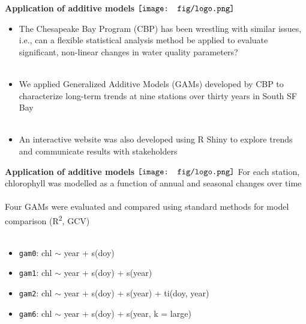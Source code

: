 \documentclass{beamer}
\begin{document}
\begin{frame}{\textbf{Application of additive models} \hspace{0pt plus 1 filll} $\vcenter{\hbox{\texttt{[image: fig/logo.png]}}}$}
\begin{itemize}
\item The Chesapeake Bay Program (CBP) has been wrestling with similar issues, i.e., can a flexible statistical analysis method be applied to evaluate significant, non-linear changes in water quality parameters? {\tiny \cite{Beck17,Murphy19}} \\~\\
\item We applied Generalized Additive Models (GAMs) developed by CBP to characterize long-term trends at nine stations over thirty years in South SF Bay \\~\\
\item An interactive website was also developed using R Shiny to explore trends and communicate results with stakeholders
\end{itemize}
\end{frame}

\begin{frame}{\textbf{Application of additive models} \hspace{0pt plus 1 filll} $\vcenter{\hbox{\texttt{[image: fig/logo.png]}}}$}
For each station, chlorophyll was modelled as a function of annual and seasonal changes over time {\tiny \cite[baytrends R package]{Murphy19b}}\\~\\
Four GAMs were evaluated and compared using standard methods for model comparison (R\textsuperscript{2}, GCV) \\~\\
\begin{itemize}
\item \texttt{gam0}: chl $\sim$ year + s(doy)
\item \texttt{gam1}: chl $\sim$ year + s(doy) + s(year)
\item \texttt{gam2}: chl $\sim$ year + s(doy) + s(year) + ti(doy, year)
\item \texttt{gam6}: chl $\sim$ year + s(doy) + s(year, k = large)
\end{itemize}
\end{frame}
\end{document}
